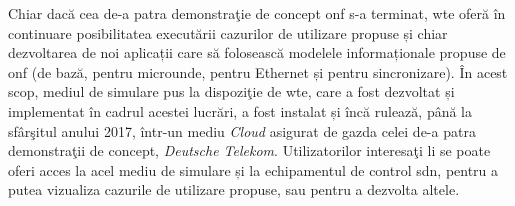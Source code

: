 Chiar dacă cea de-a patra demonstraţie de concept \gls{onf} s-a terminat, \gls{wte} oferă în continuare posibilitatea executării cazurilor de utilizare propuse și chiar dezvoltarea de noi aplicații care să folosească modelele informaționale propuse de \gls{onf} (de bază, pentru microunde, pentru Ethernet și pentru sincronizare). În acest scop, mediul de simulare pus la dispoziţie de \gls{wte}, care a fost dezvoltat și implementat în cadrul acestei lucrări, a fost instalat și încă rulează, până la sfârşitul anului 2017, într-un mediu \textit{Cloud} asigurat de gazda celei de-a patra demonstraţii de concept, \textit{Deutsche Telekom}. Utilizatorilor interesaţi li se poate oferi acces la acel mediu de simulare și la echipamentul de control \gls{sdn}, pentru a putea vizualiza cazurile de utilizare propuse, sau pentru a dezvolta altele.